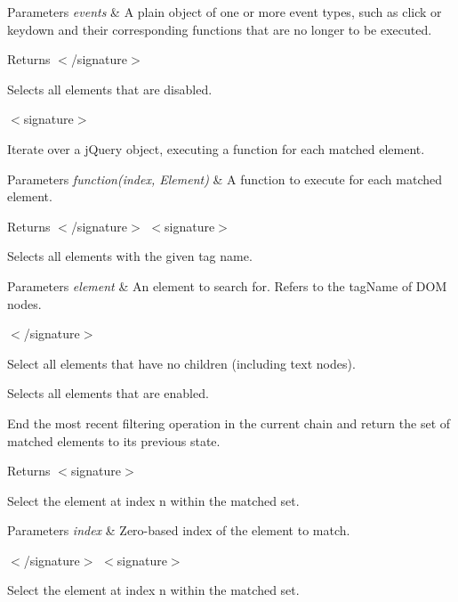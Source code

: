 \begin{DoxyParams}{Parameters}
{\em events} & A plain object of one or more event types, such as click or keydown and their corresponding functions that are no longer to be executed.\\
\hline
\end{DoxyParams}
\begin{DoxyReturn}{Returns}
$<$/signature$>$ 

Selects all elements that are disabled.
\end{DoxyReturn}
$<$signature$>$ 

Iterate over a j\+Query object, executing a function for each matched element.


\begin{DoxyParams}{Parameters}
{\em function(index, Element)} & A function to execute for each matched element.\\
\hline
\end{DoxyParams}
\begin{DoxyReturn}{Returns}
$<$/signature$>$ $<$signature$>$ 

Selects all elements with the given tag name.
\end{DoxyReturn}

\begin{DoxyParams}{Parameters}
{\em element} & An element to search for. Refers to the tag\+Name of D\+OM nodes.\\
\hline
\end{DoxyParams}
$<$/signature$>$ 

Select all elements that have no children (including text nodes).

Selects all elements that are enabled.

End the most recent filtering operation in the current chain and return the set of matched elements to its previous state.

\begin{DoxyReturn}{Returns}
$<$signature$>$ 

Select the element at index n within the matched set.
\end{DoxyReturn}

\begin{DoxyParams}{Parameters}
{\em index} & Zero-\/based index of the element to match.\\
\hline
\end{DoxyParams}
$<$/signature$>$ $<$signature$>$ 

Select the element at index n within the matched set.


